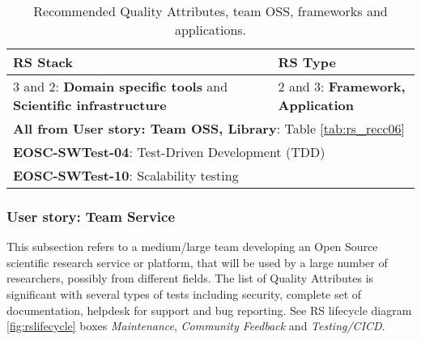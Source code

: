 \begin{center}
\begin{table}[h]

  \small
  \begin{tabular}{|p{0.65\linewidth}|p{0.35\linewidth}|} \hline

    \textbf{RS Stack} & \textbf{RS Type} \\ \hline \hline
    3 and 2: \textbf{Domain specific tools} and  \textbf{Scientific infrastructure} &
    2 and 3: \textbf{Framework, Application} \\ \hline \hline
    \multicolumn{2}{|l|}{\textbf{All from User story: Team OSS, Library}: Table \ref{tab:rs_recc06}} \\ \hline
    \multicolumn{2}{|l|}{\textbf{EOSC-SWTest-04}: Test-Driven Development (TDD)} \\ \hline
    \multicolumn{2}{|l|}{\textbf{EOSC-SWTest-10}: Scalability testing} \\ \hline

  \end{tabular}
  \caption{Recommended Quality Attributes, team OSS, frameworks and applications.}
  \label{tab:rs_recc07}
\end{table}
\end{center}

\subsubsection{User story: Team Service}

This subsection refers to a medium/large team developing an Open Source scientific research service or platform, that will be used by a large number of researchers, possibly from different fields. The list of Quality Attributes is significant with several types of tests including security, complete set of documentation, helpdesk for support and bug reporting. See RS lifecycle diagram \ref{fig:rslifecycle} boxes \textit{Maintenance}, \textit{Community Feedback} and \textit{Testing/CICD}.

